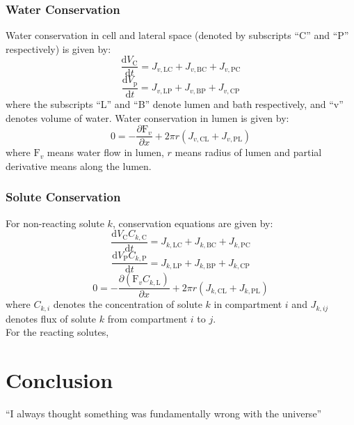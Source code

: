 \documentclass{article}
\begin{document}
\subsubsection{Water Conservation}
Water conservation in cell and lateral space (denoted by subscripts ``C'' and ``P'' respectively) is given by:\\
\begin{equation}
\frac{\mathrm{d} V_{\mathrm{C}}}{\mathrm{d} t}=J_{v, \mathrm{LC}}+J_{v, \mathrm{BC}}+J_{v, \mathrm{PC}}
\end{equation}
\begin{equation}
\frac{\mathrm{d} V_{\mathrm{p}}}{\mathrm{d} t}=J_{v, \mathrm{LP}}+J_{v, \mathrm{BP}}+J_{v, \mathrm{CP}}
\end{equation}
where the subscripts ``L'' and ``B'' denote lumen and bath respectively, and ``v'' denotes volume of water. Water conservation in lumen is given by:
\begin{equation}
0=-\frac{\partial \mathrm{F}_{v}}{\partial x}+2 \pi r (J_{v,\mathrm{CL}}+J_{v,\mathrm{PL}})
\end{equation}
where $\mathrm{F}_{v}$ means water flow in lumen, $r$ means radius of lumen and partial derivative means along the lumen.

\subsubsection{Solute Conservation}
For non-reacting solute $k$, conservation equations are given by:
\begin{equation}
\frac{\mathrm{d} V_{\mathrm{C}} C_{k, \mathrm{C}}}{\mathrm{d} t}=J_{k, \mathrm{LC}}+J_{k, \mathrm{BC}}+J_{k, \mathrm{PC}}
\end{equation}
\begin{equation}
\frac{\mathrm{d} V_{\mathrm{P}} C_{k, \mathrm{P}}}{\mathrm{d} t}=J_{k, \mathrm{LP}}+J_{k, \mathrm{BP}}+J_{k, \mathrm{CP}}
\end{equation}
\begin{equation}
0=-\frac{\partial\left(\mathrm{F}_{v} C_{k,\mathrm{L}}\right)}{\partial x}+2 \pi r (J_{k,\mathrm{CL}}+J_{k,\mathrm{PL}})
\end{equation}
where $C_{k,i}$ denotes the concentration of solute $k$ in compartment $i$ and $J_{k,ij}$ denotes flux of solute $k$ from compartment $i$ to $j$.\\

For the reacting solutes, 



\section{Conclusion}
``I always thought something was fundamentally wrong with the universe'' \citep{adams1995hitchhiker}



\end{document}
